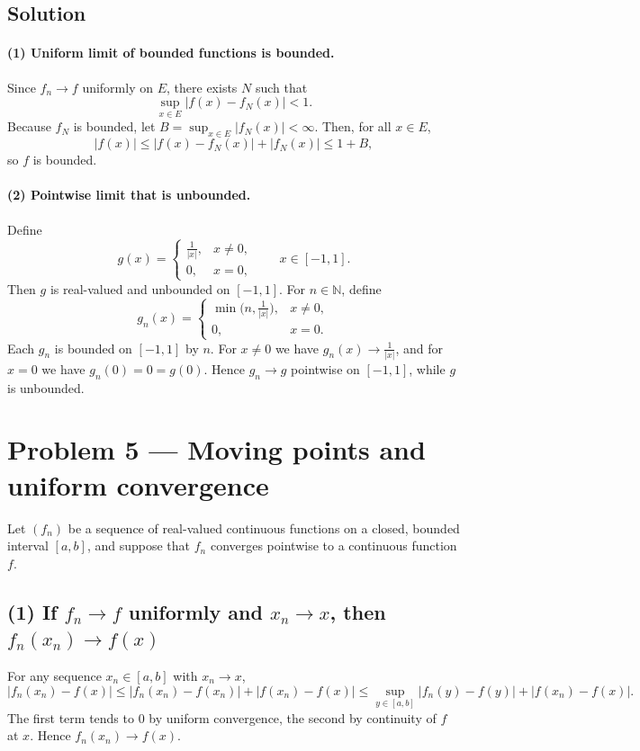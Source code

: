 \documentclass[12pt,a4paper]{article}
\theoremstyle{plain}
\theoremstyle{definition}
\theoremstyle{remark}
\theoremstyle{remark}
\begin{document}
\subsection*{Solution}

\paragraph{(1) Uniform limit of bounded functions is bounded.}
Since $f_n\to f$ uniformly on $E$, there exists $N$ such that
\[
\sup_{x\in E}|f(x)-f_N(x)|<1.
\]
Because $f_N$ is bounded, let $B=\sup_{x\in E}|f_N(x)|<\infty$. Then, for all $x\in E$,
\[
|f(x)|\le |f(x)-f_N(x)|+|f_N(x)|\le 1+B,
\]
so $f$ is bounded.

\paragraph{(2) Pointwise limit that is unbounded.}
Define
\[
g(x)=
\begin{cases}
	\frac{1}{|x|}, & x\neq 0,\\
	0, & x=0,
\end{cases}
\qquad x\in[-1,1].
\]
Then $g$ is real-valued and unbounded on $[-1,1]$.
For $n\in\mathbb{N}$, define
\[
g_n(x)=
\begin{cases}
	\min\!\big(n,\tfrac{1}{|x|}\big), & x\neq 0,\\
	0, & x=0.
\end{cases}
\]
Each $g_n$ is bounded on $[-1,1]$ by $n$. For $x\neq 0$ we have $g_n(x)\to \frac{1}{|x|}$, and for $x=0$ we have $g_n(0)=0=g(0)$. Hence $g_n\to g$ pointwise on $[-1,1]$, while $g$ is unbounded.

\section*{Problem 5 — Moving points and uniform convergence}

Let $(f_n)$ be a sequence of real-valued continuous functions on a closed, bounded interval $[a,b]$,
and suppose that $f_n$ converges pointwise to a continuous function $f$.

\subsection*{(1) If $f_n\to f$ uniformly and $x_n\to x$, then $f_n(x_n)\to f(x)$}
For any sequence $x_n\in[a,b]$ with $x_n\to x$,
\[
|f_n(x_n)-f(x)|
\le |f_n(x_n)-f(x_n)|+|f(x_n)-f(x)|
\le \sup_{y\in[a,b]}|f_n(y)-f(y)|+|f(x_n)-f(x)|.
\]
The first term tends to $0$ by uniform convergence, the second by continuity of $f$ at $x$.
Hence $f_n(x_n)\to f(x)$.
\end{document}
